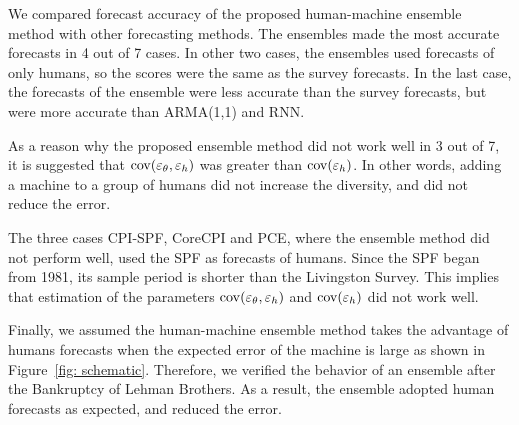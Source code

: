 \documentclass[../main.tex]{subfiles}
\begin{document}
We compared forecast accuracy of the proposed human-machine ensemble method with other forecasting methods.
The ensembles made the most accurate forecasts in 4 out of 7 cases.
In other two cases, the ensembles used forecasts of only humans, so the scores were the same as the survey forecasts.
In the last case, the forecasts of the ensemble were less accurate than the survey forecasts, but were more accurate than ARMA(1,1) and RNN\@.

As a reason why the proposed ensemble method did not work well in 3 out of 7, it is suggested that $\operatorname{cov}(\varepsilon_\theta, \varepsilon_h)$ was greater than $\operatorname{cov}(\varepsilon_h)$.
In other words, adding a machine to a group of humans did not increase the diversity, and did not reduce the error.

The three cases CPI-SPF, CoreCPI and PCE, where the ensemble method did not perform well, used the SPF as forecasts of humans.
Since the SPF began from 1981, its sample period is shorter than the Livingston Survey.
This implies that estimation of the parameters $\operatorname{cov}(\varepsilon_\theta, \varepsilon_h)$ and $\operatorname{cov}(\varepsilon_h)$ did not work well.

Finally, we assumed the human-machine ensemble method takes the advantage of humans forecasts when the expected error of the machine is large as shown in Figure~\ref{fig: schematic}.
Therefore, we verified the behavior of an ensemble after the Bankruptcy of Lehman Brothers.
As a result, the ensemble adopted human forecasts as expected, and reduced the error.
\end{document}

